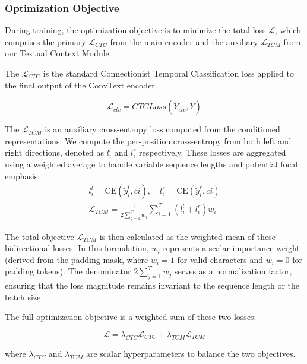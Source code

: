 \documentclass[final,5p,times]{elsarticle}
\begin{document}
\subsubsection{Optimization Objective}
During training, the optimization objective is to minimize the total loss $\mathcal{L}$, which comprises the primary $\mathcal{L}_{CTC}$ from the main encoder and the auxiliary $\mathcal{L}_{TCM}$ from our Textual Context Module.

The $\mathcal{L}_{CTC}$ is the standard Connectionist Temporal Classification loss applied to the final output of the ConvText encoder.

\begin{equation}
\mathcal{L}_{ctc} = CT CLoss(\tilde{Y}_{ctc}, Y)
\label{eq:ctc loss}
\end{equation}

The $\mathcal{L}_{TCM}$ is an auxiliary cross-entropy loss computed from the conditioned representations. We compute the per-position cross-entropy from both left and right directions, denoted as $l_{i}^{l}$ and $l_{i}^{r}$ respectively. These losses are aggregated using a weighted average to handle variable sequence lengths and potential focal
emphasis:
\begin{equation}
\begin{gathered}
l_{i}^{l}=\text{CE}(\tilde{y}_{i}^{l},c{i}), \quad l_{i}^{r}=\text{CE}(\tilde{y}_{i}^{r},c{i}) \\
\mathcal{L}_{TCM}=\frac{1}{2 \sum_{j=1}^{T} w_{j}} \sum_{i=1}^{T} (l_{i}^{l} + l_{i}^{r}) w_{i
}\end{gathered}
\label{eq:tcm_loss}
\end{equation}

The total objective $\mathcal{L}_{TCM}$ is then calculated as the weighted mean of these bidirectional losses. In this formulation, $w_i$ represents a scalar importance weight (derived from the padding mask, where $w_i=1$ for valid characters and $w_i=0$ for padding tokens). The denominator $2 \sum_{j=1}^{T} w_{j}$ serves as a normalization factor, ensuring that the loss magnitude remains invariant to the sequence length or the batch size.

The full optimization objective is a weighted sum of these two losses:

\begin{equation}
\mathcal{L}=\lambda_{CTC}\mathcal{L}_{CTC}+\lambda_{TCM}\mathcal{L}_{TCM}
\label{eq:loss}
\end{equation}

where $\lambda_{CTC}$ and $\lambda_{TCM}$ are scalar hyperparameters to balance the two objectives.
\end{document}
